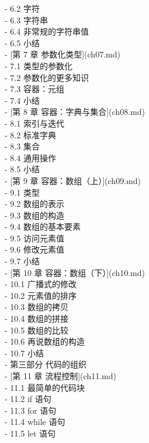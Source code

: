         - 6.2 字符 \\
        - 6.3 字符串 \\
        - 6.4 非常规的字符串值 \\
        - 6.5 小结 \\
    - [第 7 章 参数化类型](ch07.md) \\
        - 7.1 类型的参数化 \\
        - 7.2 参数化的更多知识 \\
        - 7.3 容器：元组 \\
        - 7.4 小结 \\
    - [第 8 章 容器：字典与集合](ch08.md) \\
        - 8.1 索引与迭代 \\
        - 8.2 标准字典 \\
        - 8.3 集合 \\
        - 8.4 通用操作 \\
        - 8.5 小结 \\
    - [第 9 章 容器：数组（上）](ch09.md) \\
        - 9.1 类型 \\
        - 9.2 数组的表示 \\
        - 9.3 数组的构造 \\
        - 9.4 数组的基本要素 \\
        - 9.5 访问元素值 \\
        - 9.6 修改元素值 \\
        - 9.7 小结 \\
    - [第 10 章 容器：数组（下）](ch10.md) \\
        - 10.1 广播式的修改 \\
        - 10.2 元素值的排序 \\
        - 10.3 数组的拷贝 \\
        - 10.4 数组的拼接 \\
        - 10.5 数组的比较 \\
        - 10.6 再说数组的构造 \\
        - 10.7 小结 \\
- 第三部分 代码的组织 \\
    - [第 11 章 流程控制](ch11.md) \\
        - 11.1 最简单的代码块 \\
        - 11.2 if 语句 \\
        - 11.3 for 语句 \\
        - 11.4 while 语句 \\
        - 11.5 let 语句 \\
